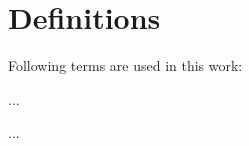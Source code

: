 \chapter{Definitions}

Following terms are used in this work:\par\bigskip

\begin{description}[style=multiline, labelwidth=5cm, leftmargin=5.5cm]

  \item[...]
       ...

  \item[...\\]
       ...

  

\end{description}

